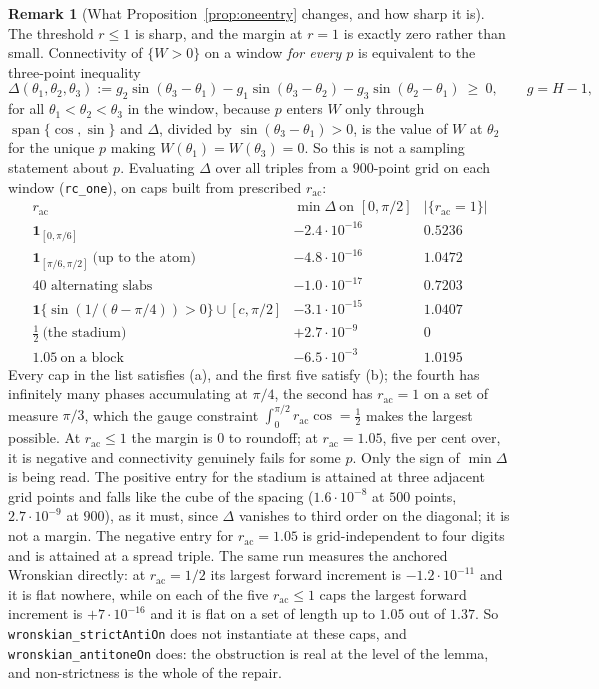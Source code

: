 \documentclass[11pt]{article}
\theoremstyle{definition}
\newtheorem{remark}[theorem]{Remark}
\begin{document}
\begin{remark}[What Proposition~\ref{prop:oneentry} changes, and how sharp it is]
The threshold $r\le1$ is sharp, and the margin at $r=1$ is exactly zero rather than small.
Connectivity of $\{W>0\}$ on a window \emph{for every $p$} is equivalent to the three-point
inequality
\[
  \Delta(\theta_1,\theta_2,\theta_3):=g_2\sin(\theta_3-\theta_1)-g_1\sin(\theta_3-\theta_2)
    -g_3\sin(\theta_2-\theta_1)\ \ge\ 0,
  \qquad g=H-1,
\]
for all $\theta_1<\theta_2<\theta_3$ in the window, because $p$ enters $W$ only through
$\operatorname{span}\{\cos,\sin\}$ and $\Delta$, divided by $\sin(\theta_3-\theta_1)>0$, is
the value of $W$ at $\theta_2$ for the unique $p$ making $W(\theta_1)=W(\theta_3)=0$. So this
is not a sampling statement about $p$. Evaluating $\Delta$ over all triples from a $900$-point
grid on each window (\verb|rc_one|), on caps built from prescribed $r_{\mathrm{ac}}$:
\[
  \begin{array}{l|cc}
    r_{\mathrm{ac}} & \min\Delta\ \text{on }[0,\pi/2] & |\{r_{\mathrm{ac}}=1\}| \\\hline
    \mathbf 1_{[0,\pi/6]} & -2.4\cdot10^{-16} & 0.5236 \\
    \mathbf 1_{[\pi/6,\pi/2]}\ \text{(up to the atom)} & -4.8\cdot10^{-16} & 1.0472 \\
    \text{$40$ alternating slabs} & -1.0\cdot10^{-17} & 0.7203 \\
    \mathbf 1\{\sin(1/(\theta-\pi/4))>0\}\cup[c,\pi/2] & -3.1\cdot10^{-15} & 1.0407 \\
    \tfrac12\ \text{(the stadium)} & +2.7\cdot10^{-9} & 0 \\
    1.05\ \text{on a block} & -6.5\cdot10^{-3} & 1.0195
  \end{array}
\]
Every cap in the list satisfies (a), and the first five satisfy (b); the fourth has
infinitely many phases accumulating at $\pi/4$, the second has $r_{\mathrm{ac}}=1$ on a set of
measure $\pi/3$, which the gauge constraint $\int_0^{\pi/2}r_{\mathrm{ac}}\cos=\tfrac12$ makes
the largest possible. At $r_{\mathrm{ac}}\le1$ the margin is $0$ to roundoff; at
$r_{\mathrm{ac}}=1.05$, five per cent over, it is negative and connectivity genuinely fails
for some $p$. Only the sign of $\min\Delta$ is being read. The positive entry for the stadium
is attained at three adjacent grid points and falls like the cube of the spacing
($1.6\cdot10^{-8}$ at $500$ points, $2.7\cdot10^{-9}$ at $900$), as it must, since $\Delta$
vanishes to third order on the diagonal; it is not a margin. The negative entry for
$r_{\mathrm{ac}}=1.05$ is grid-independent to four digits and is attained at a spread triple. The same run measures the anchored Wronskian directly: at $r_{\mathrm{ac}}=1/2$
its largest forward increment is $-1.2\cdot10^{-11}$ and it is flat nowhere, while on each of
the five $r_{\mathrm{ac}}\le1$ caps the largest forward increment is $+7\cdot10^{-16}$ and it
is flat on a set of length up to $1.05$ out of $1.37$. So \verb|wronskian_strictAntiOn| does
not instantiate at these caps, and \verb|wronskian_antitoneOn| does: the obstruction is real
at the level of the lemma, and non-strictness is the whole of the repair.


\end{remark}
\end{document}
